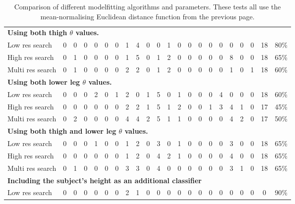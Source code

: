 \documentclass[a4paper,12pt]{article}
\begin{document}
\begin{landscape}
\begin{table}[p]
\begin{tabular}{|l|c@{ }c|c@{ }c|c@{ }c|c@{ }c|c@{ }c|c@{ }c|c@{ }c|c@{ }c|c@{ }c|c@{ }c|c|}
			\hline
			\multicolumn{22}{|l|}{\textbf{Using both thigh $\theta$ values.}} \\
			Low res search             & 0 & 0 & 0 & 0 & 0 & 0 & 1 & 4 & 0 & 0 & 1 & 0 & 0 & 0 & 0 & 0 & 0 & 0 & 0 & 18 & 80\% \\
			High res search            & 0 & 1 & 0 & 0 & 0 & 0 & 1 & 5 & 0 & 1 & 2 & 0 & 0 & 0 & 0 & 0 & 8 & 0 & 0 & 18 & 65\% \\
			Multi res search           & 0 & 1 & 0 & 0 & 0 & 0 & 2 & 2 & 0 & 1 & 2 & 0 & 0 & 0 & 0 & 0 & 1 & 0 & 1 & 18 & 60\% \\
			
			\hline
			\multicolumn{22}{|l|}{\textbf{Using both lower leg $\theta$ values.}} \\
			Low res search             & 0 & 0 & 0 & 2 & 0 & 1 & 2 & 0 & 1 & 5 & 0 & 1 & 0 & 0 & 0 & 4 & 0 & 0 & 0 & 18 & 60\% \\
			High res search            & 0 & 0 & 0 & 0 & 0 & 0 & 2 & 2 & 1 & 5 & 1 & 2 & 0 & 0 & 1 & 3 & 4 & 1 & 0 & 17 & 45\% \\
			Multi res search           & 0 & 2 & 0 & 0 & 0 & 0 & 4 & 4 & 2 & 5 & 1 & 1 & 0 & 0 & 0 & 0 & 4 & 2 & 0 & 17 & 50\% \\
			
			\hline
			\multicolumn{22}{|l|}{\textbf{Using both thigh and lower leg $\theta$ values.}} \\
			Low res search             & 0 & 0 & 0 & 1 & 0 & 0 & 1 & 2 & 0 & 3 & 0 & 1 & 0 & 0 & 0 & 0 & 3 & 0 & 0 & 18 & 65\% \\
			High res search            & 0 & 0 & 0 & 0 & 0 & 0 & 1 & 2 & 0 & 4 & 2 & 1 & 0 & 0 & 0 & 0 & 4 & 0 & 0 & 18 & 65\% \\
			Multi res search           & 0 & 1 & 0 & 0 & 0 & 0 & 3 & 3 & 0 & 4 & 0 & 0 & 0 & 0 & 0 & 0 & 3 & 1 & 0 & 18 & 65\% \\
			
			\hline
			\multicolumn{22}{|l|}{\textbf{Including the subject's height as an additional classifier}} \\
			Low res search             & 0 & 0 & 0 & 0 & 0 & 0 & 2 & 1 & 0 & 0 & 0 & 0 & 0 & 0 & 0 & 0 & 0 & 0 & 0 & 0 & 90\% \\
			
			\hline
		\end{tabular}
		\caption{Comparison of different modelfitting algorithms and parameters.
			These tests all use the mean-normalising Euclidean distance function from the previous page.}
		\label{ClassificationResults2}
	\end{table}
\end{landscape}

\newpage

\end{document}
